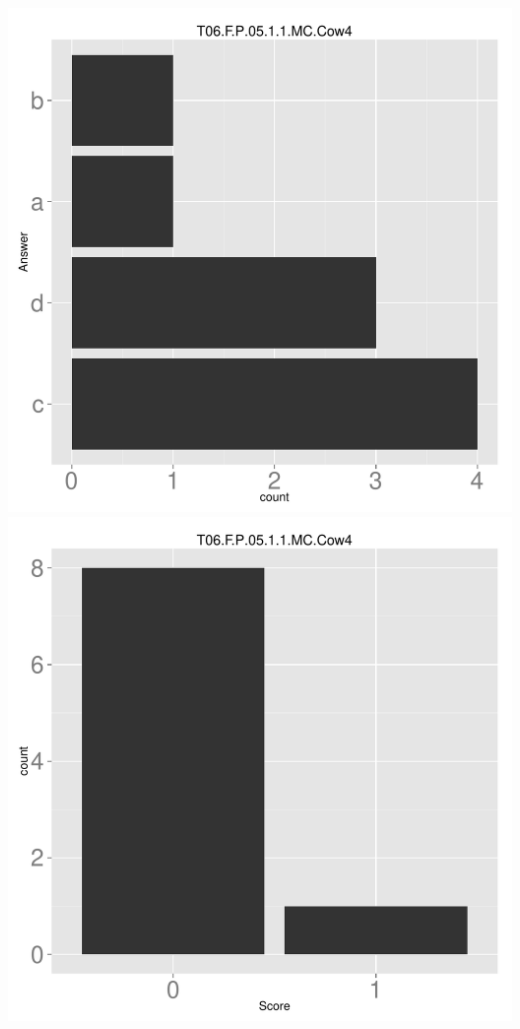 \documentclass[12pt,english,nohyper]{tufte-handout}\usepackage[]{graphicx}\usepackage[]{color}
\begin{document}
\begin{center} \includegraphics[width=.45\linewidth]{Topic06_AB_64_answer} \includegraphics[width=.45\linewidth]{Topic06_AB_64_score} \end{center} 
\end{document}
